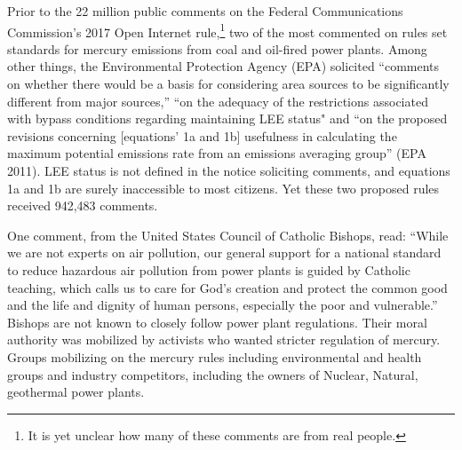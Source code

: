 
Prior to the 22 million public comments on the Federal Communications Commission's 2017 Open Internet rule,\footnote{It is yet unclear how many of these comments are from real people.} two of the most commented on rules set standards for mercury emissions from coal and oil-fired power plants. Among other things, the Environmental Protection Agency (EPA) solicited ``comments on whether there would be a basis for considering area sources to be significantly different from major sources,'' ``on the adequacy of the restrictions associated with bypass conditions regarding maintaining LEE status" and ``on the proposed revisions concerning [equations' 1a and 1b] usefulness in calculating the maximum potential emissions rate from an emissions averaging group'' (EPA 2011). LEE status is not defined in the notice soliciting comments, and equations 1a and 1b are surely inaccessible to most citizens. Yet these two proposed rules received 942,483 comments. 

One comment, from the United States Council of Catholic Bishops, read: ``While we are not experts on air pollution, our general support for a national standard to reduce hazardous air pollution from power plants is guided by Catholic teaching, which calls us to care for God’s creation and protect the common good and the life and dignity of human persons, especially the poor and vulnerable.'' Bishops are not known to closely follow power plant regulations. Their moral authority was mobilized by activists who wanted stricter regulation of mercury. Groups mobilizing on the mercury rules including environmental and health groups and industry competitors, including the owners of Nuclear, Natural, geothermal power plants. 

